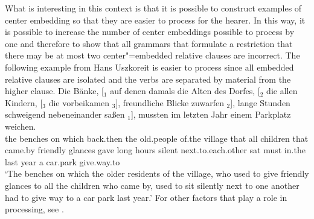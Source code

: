 \noindent
What is interesting in this context is that it is possible to construct examples of center embedding so that they are easier to process
for the hearer. In this way, it is possible to increase the number of center embeddings possible to
process by one and therefore to show that all grammars that formulate a restriction that there may
be at most two center"=embedded relative clauses are incorrect.
The following example from Hans Uszkoreit is easier to process since all embedded relative clauses are isolated and the verbs
are separated by material from the higher clause.
\ea
\gll Die Bänke, [$_1$ auf denen damals die Alten des Dorfes, [$_2$ die allen Kindern, [$_3$ die vorbeikamen $_3$], freundliche Blicke zuwarfen $_2$], 
lange Stunden schweigend nebeneinander saßen $_1$], mussten im letzten Jahr einem Parkplatz weichen.\\
the benches {} on which back.then the old.people of.the village {} that all children {} that came.by {} friendly glances gave {}
long hours silent next.to.each.other sat {} must in.the last year a car.park give.way.to\\
\glt `The benches on which the older residents of the village, who used to give friendly glances to all the children who came by, used to sit silently next to one 
another had to give way to a car park last year.'
\z
For other factors that play a role in processing, see .

